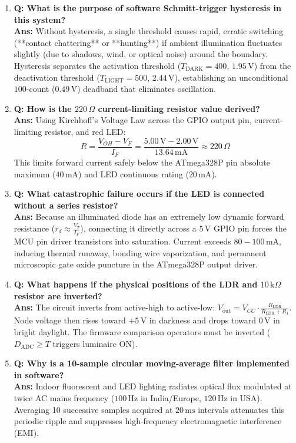 \documentclass[10pt,a4paper]{article}
\begin{document}
\begin{enumerate}[leftmargin=*]
    \item \textbf{Q: What is the purpose of software Schmitt-trigger hysteresis in this system?}\\
    \textbf{Ans:} Without hysteresis, a single threshold causes rapid, erratic switching (**contact chattering** or **hunting**) if ambient illumination fluctuates slightly (due to shadows, wind, or optical noise) around the boundary. Hysteresis separates the activation threshold ($T_{\text{DARK}} = 400$, $1.95\,\text{V}$) from the deactivation threshold ($T_{\text{LIGHT}} = 500$, $2.44\,\text{V}$), establishing an unconditional $100$-count ($0.49\,\text{V}$) deadband that eliminates oscillation.

    \item \textbf{Q: How is the $220\,\Omega$ current-limiting resistor value derived?}\\
    \textbf{Ans:} Using Kirchhoff's Voltage Law across the GPIO output pin, current-limiting resistor, and red LED:
    $$R = \frac{V_{OH} - V_F}{I_F} = \frac{5.00\,\text{V} - 2.00\,\text{V}}{13.64\,\text{mA}} \approx 220\,\Omega$$
    This limits forward current safely below the ATmega328P pin absolute maximum ($40\,\text{mA}$) and LED continuous rating ($20\,\text{mA}$).

    \item \textbf{Q: What catastrophic failure occurs if the LED is connected without a series resistor?}\\
    \textbf{Ans:} Because an illuminated diode has an extremely low dynamic forward resistance ($r_d \approx \frac{V_T}{I_F}$), connecting it directly across a $5\,\text{V}$ GPIO pin forces the MCU pin driver transistors into saturation. Current exceeds $80-100\,\text{mA}$, inducing thermal runaway, bonding wire vaporization, and permanent microscopic gate oxide puncture in the ATmega328P output driver.

    \item \textbf{Q: What happens if the physical positions of the LDR and $10\,\text{k}\Omega$ resistor are inverted?}\\
    \textbf{Ans:} The circuit inverts from active-high to active-low: $V_{\text{out}} = V_{CC} \cdot \frac{R_{\text{LDR}}}{R_{\text{LDR}} + R_1}$. Node voltage then rises toward $+5\,\text{V}$ in darkness and drops toward $0\,\text{V}$ in bright daylight. The firmware comparison operators must be inverted ($D_{\text{ADC}} \ge T$ triggers luminaire ON).

    \item \textbf{Q: Why is a 10-sample circular moving-average filter implemented in software?}\\
    \textbf{Ans:} Indoor fluorescent and LED lighting radiates optical flux modulated at twice AC mains frequency ($100\,\text{Hz}$ in India/Europe, $120\,\text{Hz}$ in USA). Averaging 10 successive samples acquired at $20\,\text{ms}$ intervals attenuates this periodic ripple and suppresses high-frequency electromagnetic interference (EMI).


\end{enumerate}
\end{document}
